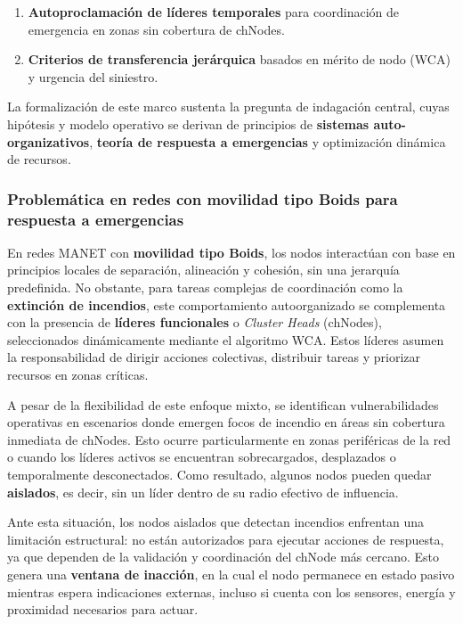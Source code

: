 \documentclass{article}
\begin{document}
\begin{enumerate}
    \item \textbf{Autoproclamación de líderes temporales} para coordinación de emergencia en zonas sin cobertura de chNodes.
    \item \textbf{Criterios de transferencia jerárquica} basados en mérito de nodo (WCA) y urgencia del siniestro.
\end{enumerate}

La formalización de este marco sustenta la pregunta de indagación central, cuyas hipótesis y modelo operativo se derivan de principios de \textbf{sistemas auto-organizativos}, \textbf{teoría de respuesta a emergencias} y optimización dinámica de recursos.


\subsubsection{Problemática en redes con movilidad tipo Boids para respuesta a emergencias}
En redes MANET con \textbf{movilidad tipo Boids}, los nodos interactúan con base en principios locales de separación, alineación y cohesión, sin una jerarquía predefinida. No obstante, para tareas complejas de coordinación como la \textbf{extinción de incendios}, este comportamiento autoorganizado se complementa con la presencia de \textbf{líderes funcionales} o \textit{Cluster Heads} (chNodes), seleccionados dinámicamente mediante el algoritmo WCA. Estos líderes asumen la responsabilidad de dirigir acciones colectivas, distribuir tareas y priorizar recursos en zonas críticas.

A pesar de la flexibilidad de este enfoque mixto, se identifican vulnerabilidades operativas en escenarios donde emergen focos de incendio en áreas sin cobertura inmediata de chNodes. Esto ocurre particularmente en zonas periféricas de la red o cuando los líderes activos se encuentran sobrecargados, desplazados o temporalmente desconectados. Como resultado, algunos nodos pueden quedar \textbf{aislados}, es decir, sin un líder dentro de su radio efectivo de influencia.

Ante esta situación, los nodos aislados que detectan incendios enfrentan una limitación estructural: no están autorizados para ejecutar acciones de respuesta, ya que dependen de la validación y coordinación del chNode más cercano. Esto genera una \textbf{ventana de inacción}, en la cual el nodo permanece en estado pasivo mientras espera indicaciones externas, incluso si cuenta con los sensores, energía y proximidad necesarios para actuar.
\end{document}
